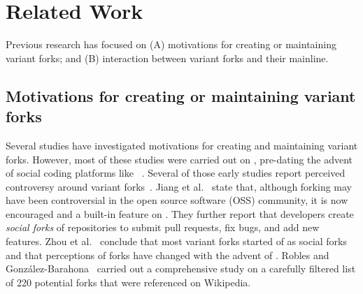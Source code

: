 
\section{Related Work}
\label{sec:background}
Previous research has focused on (A) motivations for creating or maintaining variant forks; and (B) interaction between variant forks and their mainline.%



\subsection{Motivations for creating or maintaining variant forks}
\label{sec:motivations}

Several studies have investigated motivations for creating and maintaining variant forks. However, most of these studies were carried out on \sourceforge, pre-dating the advent of social coding platforms like \gh~\cite{Linus:2012Perspectives,Gregorio:2012,Viseur:2012Forks,Linus:2013CodeForking,Laurent:2008,Linus:2011ToFork}. Several of those early studies report 
perceived controversy 
around variant forks~\cite{Chua:Forking:2017,Dixion:2009Forks,Ernst:2010,Linus:2011ToFork,Linus:2014Hackers,Raymond:Cathedral:2001,pete}.
Jiang et al.~\cite{Lo:2017} state that, although forking may have been controversial in the open source software (OSS) community, it is now encouraged and a built-in feature on \gh. They further report that developers create \emph{social forks} of repositories to submit pull requests, fix bugs, and add new features. Zhou et al.~\cite{Zhou:2020} conclude that most variant forks started of as social forks
and that perceptions of forks have changed with the advent of \gh.
Robles and Gonz{\'a}lez-Barahona~\cite{Gregorio:2012} carried out a comprehensive study on a carefully filtered list of 220 potential forks that were referenced on Wikipedia.

